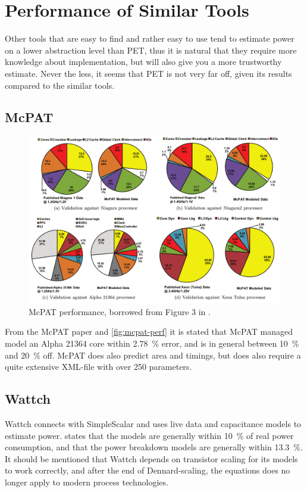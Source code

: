 \section{Performance of Similar Tools}
Other tools that are easy to find and rather easy to use tend to estimate
power on a lower abstraction level than PET, thus it is natural that they
require more knowledge about implementation, but will also give you a more
trustworthy estimate. Never the less, it seems that PET is not very far off,
given its results compared to the similar tools.

\subsection{McPAT}

\begin{figure}[htb]
\includegraphics[width=\textwidth]{figs/mcpat-performance.png}
\caption{McPAT performance, borrowed from Figure 3 in \cite{li2009mcpat}.}
\label{fig:mcpat-perf}
\end{figure}

From the McPAT paper \cite{li2009mcpat} and \autoref{fig:mcpat-perf} it is
stated that McPAT managed model an Alpha 21364 core within 2.78~\% error, and is
in general between 10~\% and 20~\% off. McPAT does also predict area and timings,
but does also require a quite extensive XML-file with over 250 parameters.

\subsection{Wattch}

Wattch connects with SimpleScalar and uses live data and capacitance models to
estimate power. \cite{brooks2000wattch} states that the models are generally
within 10~\% of real power consumption, and that the power breakdown models are
generally within 13.3~\%. It should be mentioned that Wattch depends on
transistor scaling for its models to work correctly, and after the end of
Dennard-scaling, the equations does no longer apply to modern process
technologies.



